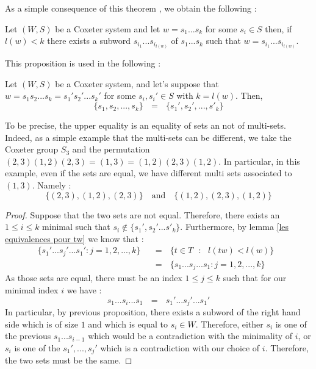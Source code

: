 \documentclass[envcountsame,envcountchap]{svmono}
\newcommand{\q}{\quad}
\newcommand{\qq}{\text{ }}
\begin{document}
As a simple consequence of this theorem , we obtain the following :
\begin{proposition}
	Let $(W,S)$ be a Coxeter system and let $w=s_1...s_k$ for some $s_i\in S$ then, if $l(w)<k$ there exists a subword $s_{i_1}...s_{i_{l(w)}}$ of $s_1...s_k$ such that $w=s_{i_1}...s_{i_{l(w)}}$.
\end{proposition}
This proposition is used in the following :
\begin{proposition}
	Let $(W,S)$ be a Coxeter system, and let's suppose that $w=s_1s_2...s_k=s_1's_2'...s_k'$ for some $s_i,s_i'\in S$ with $k=l(w) $. Then, \begin{equation}
	\{s_1,s_2,...,s_k\}\qq=\qq \{s_1',s_2',...,s'_k\}
	\end{equation}
\end{proposition}
\begin{remark}
	To be precise, the upper equality is an equality of sets an not of multi-sets. Indeed, as a simple example that the multi-sets can be different, we take the Coxeter group $S_3$ and the permutation $(2,3)(1,2)(2,3)=(1,3)=(1,2)(2,3)(1,2)$. In particular, in this example, even if the sets are equal, we have different multi sets associated to $(1,3)$. Namely :
	\begin{equation}
	\{(2,3),(1,2),(2,3)\}\q \mbox{and}\q \{(1,2),(2,3),(1,2)\}
	\end{equation}
\end{remark}
\begin{proof}
	Suppose that the two sets are not equal. Therefore, there exists an $1\leq i\leq k$ minimal such that $s_i\not\in  \{s_1',s_2'...s'_k\}$. Furthermore, by lemma \ref{les equivalences pour tw} we know that :
	\begin{equation}
	\begin{split}
	\{s_1'...s_j'...s_1':j=1,2,...,k\}\qq&=\qq \{t\in T\qq:\qq l(tw)<l(w)\}\qq\\
	&=\qq \{s_1...s_j...s_1:j=1,2,...,k\}
	\end{split}
	\end{equation}
	As those sets are equal, there must be an index $1\leq j\leq k$ such that for our minimal index $i$ we have :
	\begin{equation}
	s_1...s_i...s_1\qq=\qq s_1'...s_j'...s_1'
	\end{equation}
	In particular, by previous proposition, there exists a subword of the right hand side which is of size $1$ and which is equal to $s_i\in W$. Therefore, either $s_i$ is one of the previous $s_1...s_{i-1}$ which would be a contradiction with the minimality of $i$, or $s_i$ is one of the $s_1',...,s_j'$ which is a contradiction with our choice of $i$. Therefore, the two sets must be the same.
\end{proof}
\end{document}
